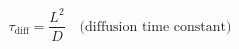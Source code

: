 \documentclass[preview]{standalone}
\begin{document}
\[\tau_\text{diff} = \frac{L^2}{D} \quad \text{(diffusion time constant)} \tag{2.6}\]
\end{document}

